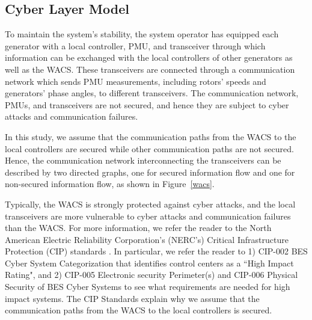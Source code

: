 \subsection{Cyber Layer Model}
To maintain the system's stability, the system operator has equipped each generator with a local controller, PMU, and transceiver through which information can be exchanged with the local controllers of other generators as well as the WACS. These transceivers are connected through a communication network which sends PMU measurements, including rotors' speeds and generators' phase angles, to different transceivers. The communication network, PMUs, and transceivers are not secured, and hence they are subject to cyber attacks and communication failures.

In this study, we assume that the communication paths from the WACS to the local controllers are secured while other communication paths are not secured. Hence, the communication network interconnecting the transceivers can be described by two directed graphs, one for secured information flow and one for non-secured information flow, as shown in Figure~\ref{wacs}.


Typically, the WACS is strongly protected against cyber attacks, and the local transceivers are more vulnerable to cyber attacks and communication failures than the WACS. For more information, we refer the reader to the North American Electric Reliability Corporation's (NERC's) Critical Infrastructure Protection (CIP) standards \cite{nerc}. In particular, we refer the reader to 1) CIP-002 BES Cyber System Categorization that identifies control centers as a ``High Impact Rating", and 2) CIP-005 Electronic security Perimeter(s) and CIP-006 Physical Security of BES Cyber Systems to see what requirements are needed for high impact systems. The CIP Standards explain why we assume that the communication paths from the WACS to the local controllers is secured.

